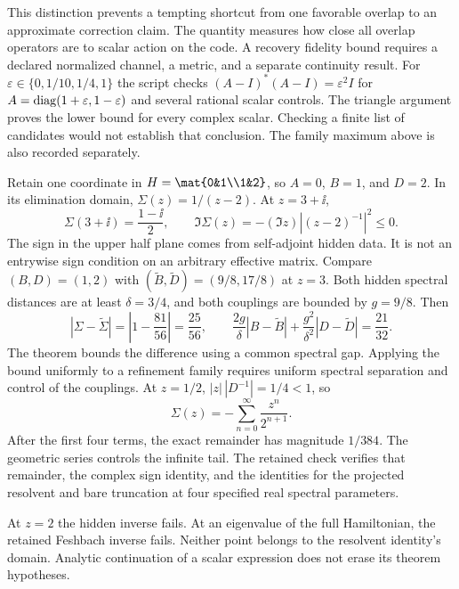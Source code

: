 This distinction prevents a tempting shortcut from one favorable overlap to an approximate correction claim. The quantity measures how close all overlap operators are to scalar action on the code. A recovery fidelity bound requires a declared normalized channel, a metric, and a separate continuity result.
For $\varepsilon\in\{0,1/10,1/4,1\}$ the script checks $(A-I)^*(A-I)=\varepsilon^2I$ for $A=\operatorname{diag}(1+\varepsilon,1-\varepsilon)$ and several rational scalar controls. The triangle argument proves the lower bound for every complex scalar. Checking a finite list of candidates would not establish that conclusion. The family maximum above is also recorded separately.

Retain one coordinate in $H=\mat{0&1\\1&2}$, so $A=0$, $B=1$, and $D=2$. In its elimination domain, $\Sigma(z)=1/(z-2)$. At $z=3+\ii$,
\[
\Sigma(3+\ii)=\frac{1-\ii}{2},\qquad
\Im\Sigma(z)=-(\Im z)\left|(z-2)^{-1}\right|^2\leq0.
\]
The sign in the upper half plane comes from self-adjoint hidden data. It is not an entrywise sign condition on an arbitrary effective matrix.
Compare $(B,D)=(1,2)$ with $(\widetilde B,\widetilde D)=(9/8,17/8)$ at $z=3$. Both hidden spectral distances are at least $\delta=3/4$, and both couplings are bounded by $g=9/8$. Then
\[
|\Sigma-\widetilde\Sigma|=\left|1-\frac{81}{56}\right|=\frac{25}{56},
\qquad
\frac{2g}{\delta}|B-\widetilde B|
+\frac{g^2}{\delta^2}|D-\widetilde D|=\frac{21}{32}.
\]
The theorem bounds the difference using a common spectral gap. Applying the bound uniformly to a refinement family requires uniform spectral separation and control of the couplings.
At $z=1/2$, $|z|\,|D^{-1}|=1/4<1$, so
\[
\Sigma(z)=-\sum_{n=0}^{\infty}\frac{z^n}{2^{n+1}}.
\]
After the first four terms, the exact remainder has magnitude $1/384$. The geometric series controls the infinite tail. The retained check verifies that remainder, the complex sign identity, and the identities for the projected resolvent and bare truncation at four specified real spectral parameters.

At $z=2$ the hidden inverse fails. At an eigenvalue of the full Hamiltonian, the retained Feshbach inverse fails. Neither point belongs to the resolvent identity's domain. Analytic continuation of a scalar expression does not erase its theorem hypotheses.

